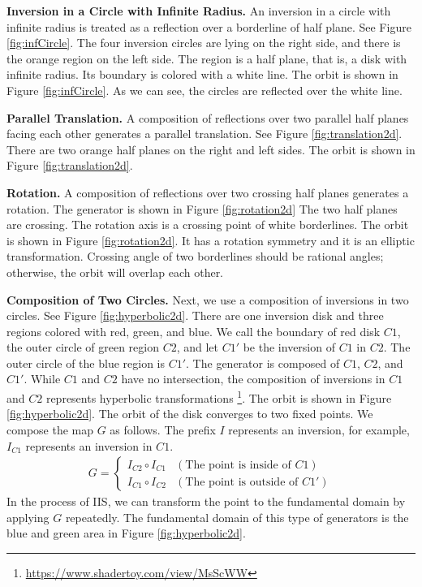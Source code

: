 \noindent\textbf{Inversion in a Circle with Infinite Radius.}
An inversion in a circle with infinite radius is treated as a reflection
over a borderline of half plane. See Figure
\ref{fig:infCircle}.
The four inversion circles are lying on the right side, and there is the
orange region on the left side. The region is a half plane, that is, a
disk with infinite radius. Its boundary is colored with a white line.
The orbit is shown in
Figure \ref{fig:infCircle}.
As we can see, the circles are reflected over the white line.

\noindent\textbf{Parallel Translation.}
A composition of reflections over two parallel half planes facing each
other generates a parallel translation. See Figure
\ref{fig:translation2d}.
There are two orange half planes on the right and left sides.
The orbit is shown in Figure
\ref{fig:translation2d}.

\noindent\textbf{Rotation.}
A composition of reflections over two crossing half planes generates a
rotation. The generator is shown in Figure
\ref{fig:rotation2d}
The two half planes are crossing. The rotation axis is a crossing point of
white borderlines. The orbit is shown in Figure 
\ref{fig:rotation2d}.
It has a rotation symmetry and it is an elliptic transformation.
Crossing angle of two borderlines should be
rational angles; otherwise, the orbit will overlap each other.

\noindent\textbf{Composition of Two Circles.}
 Next, we use a composition of inversions in two circles.
 See Figure \ref{fig:hyperbolic2d}.
 There are one inversion disk and three regions colored with red, green,
 and blue.
 We call the boundary of red disk $C1$, 
 the outer circle of green region $C2$, and
 let $C1'$ be the inversion of $C1$ in $C2$.
 The outer circle of the blue region is $C1'$.
 The generator is composed of $C1$, $C2$, and $C1'$.
 While $C1$ and $C2$ have no intersection, the composition of inversions
 in $C1$ and $C2$ represents hyperbolic transformations
 \footnote{\url{https://www.shadertoy.com/view/MsScWW}}.
 The orbit is shown in Figure
 \ref{fig:hyperbolic2d}.
 The orbit of the disk converges to two fixed points.
 We compose the map $G$ as follows.
 The prefix $I$ represents an inversion, for example, $I_{C1}$ represents
 an inversion in $C1$.
 \begin{align*}
  G =
  \begin{cases}
   I_{C2} \circ I_{C1} & (\text{The point is inside of } C1) \\
   I_{C1} \circ I_{C2} & (\text{The point is outside of }C1')
  \end{cases}
 \end{align*}
 In the process of IIS, we can transform the point to the fundamental
 domain by applying $G$ repeatedly.
 The fundamental domain of this type of generators is the blue and green
 area in Figure \ref{fig:hyperbolic2d}.

